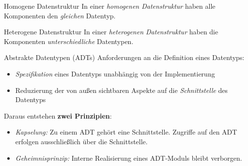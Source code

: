 \documentclass[german]{../spicker}
\begin{document}
\begin{defi}{Homogene Datenstruktur}
    In einer \emph{homogenen Datenstruktur} haben alle Komponenten den \emph{gleichen} Datentyp.
\end{defi}

\begin{defi}{Heterogene Datenstruktur}
    In einer \emph{heterogenen Datenstruktur} haben die Komponenten \emph{unterschiedliche} Datentypen.
\end{defi}

\begin{defi}{Abstrakte Datentypen (ADTs)}
    Anforderungen an die Definition eines Datentyps:
    \begin{itemize}
        \item \emph{Spezifikation} eines Datentyps unabhängig von der Implementierung
        \item Reduzierung der von außen sichtbaren Aspekte auf die \emph{Schnittstelle} des Datentyps
    \end{itemize}

    Daraus entstehen \textbf{zwei Prinzipien}:
    \begin{itemize}
        \item \emph{Kapselung:}
              \subitem Zu einem ADT gehört eine Schnittstelle.
              \subitem Zugriffe auf den ADT erfolgen ausschließlich über die Schnittstelle.
        \item \emph{Geheimnisprinzip:}
              \subitem Interne Realisierung eines ADT-Moduls bleibt verborgen.
    \end{itemize}
\end{defi}
\end{document}
